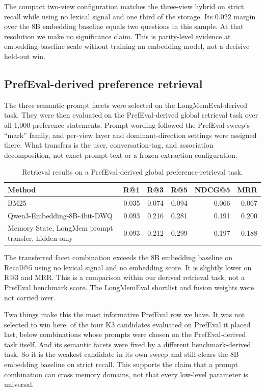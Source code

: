 \documentclass[
  10pt,
  letterpaper,
]{article}
\begin{document}
The compact two-view configuration matches the three-view hybrid on
strict recall while using no lexical signal and one third of the
storage. Its 0.022 margin over the 8B embedding baseline equals two
questions in this sample. At that resolution we make no significance
claim. This is parity-level evidence at embedding-baseline scale without
training an embedding model, not a decisive held-out win.

\subsection{PrefEval-derived preference
retrieval}\label{cross-task-transfer-to-prefeval}

The three semantic prompt facets were selected on the LongMemEval-derived
task. They were then evaluated on the PrefEval-derived global retrieval
task over all 1,000 preference statements. Prompt wording followed the
PrefEval sweep's ``mark'' family, and per-view layer and
dominant-direction settings were assigned there. What transfers is the
user, conversation-tag, and association decomposition, not exact prompt
text or a frozen extraction configuration.

\begin{table}[htbp]
\centering
\small
\caption{Retrieval results on a PrefEval-derived global
preference-retrieval task.}
\label{tab:prefeval}
\begin{tabularx}{\linewidth}{@{}Xrrrrr@{}}
\toprule
Method & R@1 & R@3 & R@5 & NDCG@5 & MRR \\
\midrule
BM25 & 0.035 & 0.074 & 0.094 & 0.066 & 0.067 \\
Qwen3-Embedding-8B-4bit-DWQ & 0.093 & 0.216 & 0.281 & 0.191 & 0.200 \\
Memory State, LongMem prompt transfer, hidden only & 0.093 & 0.212 &
0.299 & 0.197 & 0.188 \\
\bottomrule
\end{tabularx}
\end{table}

The transferred facet combination exceeds the 8B embedding baseline on
Recall@5 using no lexical signal and no embedding score. It is slightly
lower on R@3 and MRR. This is a comparison within our derived retrieval
task, not a PrefEval benchmark score. The LongMemEval shortlist and
fusion weights were not carried over.

Two things make this the most informative PrefEval row we have. It was
not selected to win here: of the four K3 candidates evaluated on
PrefEval it placed last, below combinations whose prompts were chosen on
the PrefEval-derived task itself. And its semantic facets were fixed by
a different benchmark-derived task. So it is the weakest candidate in
its own sweep and still
clears the 8B embedding baseline on strict recall. This supports the
claim that a prompt combination can cross memory domains, not that every
low-level parameter is universal.
\end{document}
